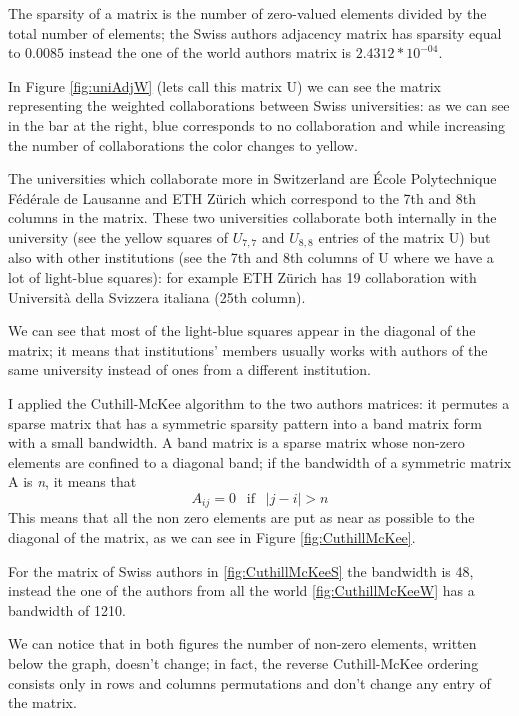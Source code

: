 \documentclass[]{usiinfbachelorproject}
\begin{document}
The sparsity of a matrix is the number of zero-valued elements divided by the total number of elements; the Swiss authors adjacency matrix has sparsity equal to $0.0085$ instead the one of the world authors matrix is $2.4312*10^{-04}$.

In Figure \ref{fig:uniAdjW} (lets call this matrix U) we can see the matrix representing the weighted collaborations between Swiss universities: as we can see in the bar at the right, blue corresponds to no collaboration and while increasing the number of collaborations the color changes to yellow.

The universities which collaborate more in Switzerland are \'{E}cole Polytechnique F\'{e}d\'{e}rale de Lausanne and ETH Z\"{u}rich which correspond to the 7th and 8th columns in the matrix. These two universities collaborate both internally in the university (see the yellow squares of $U_{7,7}$ and $U_{8,8}$ entries of the matrix U)  but also with other institutions (see the 7th and 8th columns of U where we have a lot of light-blue squares): for example  ETH Z\"{u}rich has 19 collaboration with Universit\`{a} della Svizzera italiana (25th column). 

We can see that most of the light-blue squares appear in the diagonal of the matrix; it means that institutions' members usually works with authors of the same university instead of ones from a different institution.

I applied the Cuthill-McKee algorithm to the two authors matrices: it permutes a sparse matrix that has a symmetric sparsity pattern into a band matrix form with a small bandwidth.
A band matrix is a sparse matrix whose non-zero elements are confined to a diagonal band; if the bandwidth of a symmetric matrix A is \textit{n}, it means that 
$$A_{ij} = 0  \:\: \text{ if } \:\: |j-i| > n$$
 This means that all the non zero elements are put as near as possible to the diagonal of the matrix, as we can see in Figure \ref{fig:CuthillMcKee}. 
 
For the matrix of Swiss authors in \ref{fig:CuthillMcKeeS} the bandwidth is 48, instead the one of the authors from all the world \ref{fig:CuthillMcKeeW} has a bandwidth of 1210. 

We can notice that in both figures the number of non-zero elements, written below the graph, doesn't change; in fact, the reverse Cuthill-McKee ordering consists only in rows and columns permutations and don't change any entry of the matrix.
\end{document}
